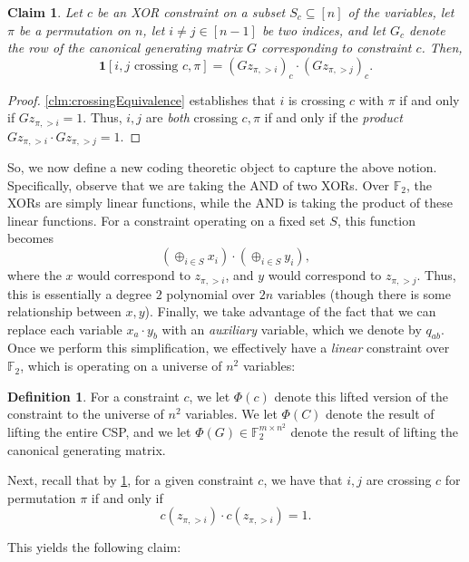 \documentclass[11pt]{article}
\newtheorem{claim}[theorem]{Claim}
\theoremstyle{definition}
\newtheorem{definition}{Definition}[section]
\newcommand{\F}{\mathbb{F}}
\begin{document}
\begin{claim}\label{clm:crossingProduct}
	Let $c$ be an XOR constraint on a subset $S_c \subseteq [n]$ of the variables, let $\pi$ be a permutation on $n$, let $i \neq j \in [n-1]$ be two indices, and let $G_c$ denote the row of the canonical generating matrix $G$ corresponding to constraint $c$. Then, 
	\[
	\mathbf{1}[i,j \text{ crossing } c, \pi] = (G z_{\pi, > i})_c \cdot (G z_{\pi, > j})_c.
	\]
\end{claim}

\begin{proof}
	\cref{clm:crossingEquivalence} establishes that $i$ is crossing $c$ with $\pi$ if and only if $G z_{\pi, > i} = 1$. Thus, $i, j$ are \emph{both} crossing $c, \pi$ if and only if the \emph{product} $G z_{\pi, > i} \cdot G z_{\pi, > j} = 1$.
\end{proof}

So, we now define a new coding theoretic object to capture the above notion. Specifically, observe that we are taking the AND of two XORs. Over $\F_2$, the XORs are simply linear functions, while the AND is taking the product of these linear functions. For a constraint operating on a fixed set $S$, this function becomes 
\[
(\oplus_{i \in S} x_i) \cdot (\oplus_{i \in S} y_i),
\]
where the $x$ would correspond to $z_{\pi, > i}$, and $y$ would correspond to $z_{\pi, > j}$. Thus, this is essentially a degree $2$ polynomial over $2n$ variables (though there is some relationship between $x, y$). Finally, we take advantage of the fact that we can replace each variable $x_a \cdot y_{b}$ with an \emph{auxiliary} variable, which we denote by $q_{ab}$. Once we perform this simplification, we effectively have a \emph{linear} constraint over $\F_2$, which is operating on a universe of $n^2$ variables:

\begin{definition}\label{def:liftedGenerating}
For a constraint $c$, we let $\Phi(c)$ denote this lifted version of the constraint to the universe of $n^2$ variables. We let $\Phi(C)$ denote the result of lifting the entire CSP, and we let $\Phi(G) \in \F_2^{m \times n^2}$ denote the result of lifting the canonical generating matrix. 
\end{definition}

Next, recall that by \cref{clm:crossingProduct}, for a given constraint $c$, we have that $i,j$ are crossing $c$ for permutation $\pi$ if and only if 
\[
c(z_{\pi, > i}) \cdot c(z_{\pi, > i}) = 1.
\]

This yields the following claim:
\end{document}
